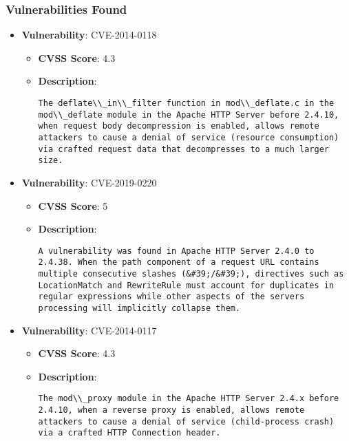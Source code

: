 \documentclass{article}
\begin{document}
\subsubsection*{Vulnerabilities Found}

\begin{itemize}
    
        \item \textbf{Vulnerability}: CVE-2014-0118
        \begin{itemize}
            \item \textbf{CVSS Score}:  4.3 
            \item \textbf{Description}:
            \parbox[t]{0.9\linewidth}{
                \verb|The deflate\\_in\\_filter function in mod\\_deflate.c in the mod\\_deflate module in the Apache HTTP Server before 2.4.10, when request body decompression is enabled, allows remote attackers to cause a denial of service (resource consumption) via crafted request data that decompresses to a much larger size.|
            }
        \end{itemize}
    
        \item \textbf{Vulnerability}: CVE-2019-0220
        \begin{itemize}
            \item \textbf{CVSS Score}:  5 
            \item \textbf{Description}:
            \parbox[t]{0.9\linewidth}{
                \verb|A vulnerability was found in Apache HTTP Server 2.4.0 to 2.4.38. When the path component of a request URL contains multiple consecutive slashes (&#39;/&#39;), directives such as LocationMatch and RewriteRule must account for duplicates in regular expressions while other aspects of the servers processing will implicitly collapse them.|
            }
        \end{itemize}
    
        \item \textbf{Vulnerability}: CVE-2014-0117
        \begin{itemize}
            \item \textbf{CVSS Score}:  4.3 
            \item \textbf{Description}:
            \parbox[t]{0.9\linewidth}{
                \verb|The mod\\_proxy module in the Apache HTTP Server 2.4.x before 2.4.10, when a reverse proxy is enabled, allows remote attackers to cause a denial of service (child-process crash) via a crafted HTTP Connection header.|
            }
        \end{itemize}
    

\end{itemize}
\end{document}
